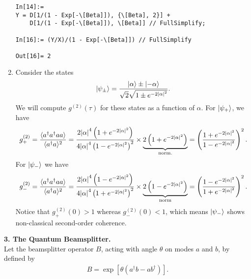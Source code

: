 \documentclass{article}
\theoremstyle{definition}
\newcommand{\al}{\alpha}
\newcommand{\f}[2]{\frac{#1}{#2}}
\newcommand{\lp}{\left(}
\newcommand{\rp}{\right)}
\newcommand{\lb}{\left[}
\newcommand{\rb}{\right]}
\begin{document}
\begin{enumerate}[label=\alph*)]
\begin{lstlisting}
In[14]:= 
Y = D[1/(1 - Exp[-\[Beta]]), {\[Beta], 2}] + 
    D[1/(1 - Exp[-\[Beta]]), \[Beta]] // FullSimplify;

In[16]:= (Y/X)/(1 - Exp[-\[Beta]]) // FullSimplify

Out[16]= 2
\end{lstlisting}

\item Consider the states
\begin{align*}
\ket{\psi_\pm} = \f{\ket{\al} \pm  \ket{-\al}}{ \sqrt{2}  \sqrt{1 \pm e^{-2\abs{\al}^2}}}.
\end{align*}
We will compute $g^{(2)} (\tau)$ for these states as a function of $\al$. For $\ket{\psi_+}$, we have
\begin{align*}
g^{(2)}_+ = \f{\langle a^\dagger a^\dagger a a \rangle}{ \langle a^\dagger a \rangle^2} = 
\f{2\abs{\al}^4 \lp 1 + e^{-2\abs{\al}^2}\rp }{  4 \abs{\al}^4 \lp 1 - e^{-2\abs{\al}^2}\rp^2 } \times \underbrace{2\lp 1 + e^{-2\abs{\al}^2} \rp}_{\text{norm.}} = 
\lp \f{1 + e^{-2\abs{\al}^2}}{ 1 - e^{-2\abs{\al}^2} }\rp^2.
\end{align*}
For $\ket{\psi_-}$ we have
\begin{align*}
g^{(2)}_- = \f{\langle a^\dagger a^\dagger a a \rangle}{ \langle a^\dagger a \rangle^2}
= \f{2\abs{\al}^4\lp  1- e^{-2\abs{\al}^2}\rp}{4\abs{\al}^4\lp 1 + e^{-2\abs{\al}^2} \rp^2} \times \underbrace{2\lp 1 - e^{-2\abs{\al}^2}\rp }_{\text{norm}} =  \lp \f{1 - e^{-2\abs{\al}^2}}{1 + e^{-2\abs{\al}^2}} \rp^2.
\end{align*}
Notice that $g_+^{(2)}(0) > 1$ whereas $g^{(2)}_-(0) < 1$, which means $\ket{\psi_-}$ shows non-classical second-order coherence. 
\end{enumerate}



\noindent \textbf{3. The Quantum Beamsplitter.}\\

\noindent Let the beamsplitter operator $B$, acting with angle $\theta$ on modes $a$ and $b$, by defined by 
\begin{align*}
B = \exp\lb \theta \lp a^\dagger b - a b^\dagger \rp \rb .
\end{align*}
\end{document}
